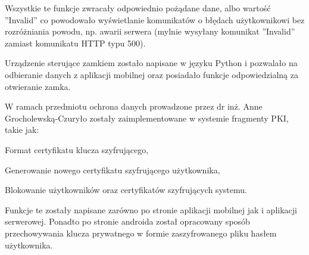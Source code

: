 	Wszystkie te funkcje zwracały odpowiednio pożądane dane, albo wartość ''Invalid'' co powodowało wyświetlanie komunikatów o błędach użytkownikowi bez rozróżniania powodu, np. awarii serwera (mylnie wysyłany komunikat ''Invalid'' zamiast komunikatu HTTP typu 500).
	
	\newpage
	Urządzenie sterujące zamkiem zostało napisane w języku Python i pozwalało na odbieranie danych z aplikacji mobilnej oraz posiadało funkcje odpowiedzialną za otwieranie zamka.

	W ramach przedmiotu ochrona danych prowadzone przez dr inż. Anne Grocholewską-Czuryło zostały zaimplementowane w systemie fragmenty PKI, takie jak:
	   \begin{itemize*}
	   	\item Format certyfikatu klucza szyfrującego,
	   	\item Generowanie nowego certyfikatu szyfrującego użytkownika,
	   	\item Blokowanie użytkowników oraz certyfikatów szyfrujących systemu.
	   \end{itemize*}
   
	 Funkcje te zostały napisane zarówno po stronie aplikacji mobilnej jak i aplikacji serwerowej. Ponadto po stronie androida został opracowany sposób przechowywania klucza prywatnego w formie zaszyfrowanego pliku hasłem użytkownika.
